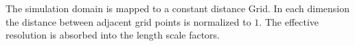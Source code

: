 The simulation domain is mapped to a constant distance Grid. In each dimension the distance between adjacent grid points is normalized to $1$.  The effective resolution is absorbed into the length scale factors. 